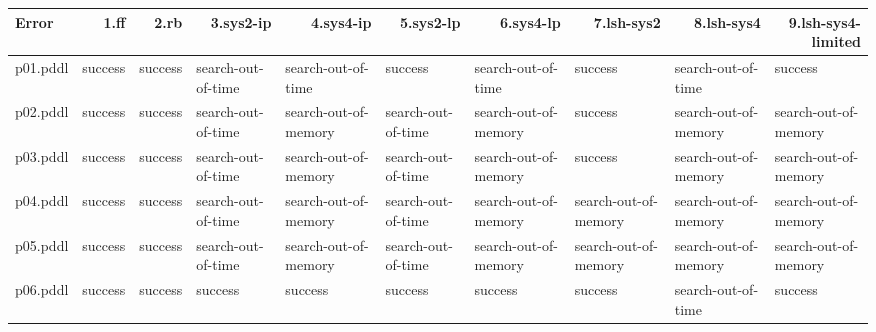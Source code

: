 \documentclass{article}
\begin{document}
\begin{tabular}{@{}lrrrrrrrrr@{}}
Error & 1.ff & 2.rb & 3.sys2-ip & 4.sys4-ip & 5.sys2-lp & 6.sys4-lp & 7.lsh-sys2 & 8.lsh-sys4 & 9.lsh-sys4-limited \\
\midrule
p01.pddl & \multicolumn{1}{|l|}{success} & \multicolumn{1}{|l|}{success} & \multicolumn{1}{|l|}{search-out-of-time} & \multicolumn{1}{|l|}{search-out-of-time} & \multicolumn{1}{|l|}{success} & \multicolumn{1}{|l|}{search-out-of-time} & \multicolumn{1}{|l|}{success} & \multicolumn{1}{|l|}{search-out-of-time} & \multicolumn{1}{|l|}{success} \\
p02.pddl & \multicolumn{1}{|l|}{success} & \multicolumn{1}{|l|}{success} & \multicolumn{1}{|l|}{search-out-of-time} & \multicolumn{1}{|l|}{search-out-of-memory} & \multicolumn{1}{|l|}{search-out-of-time} & \multicolumn{1}{|l|}{search-out-of-memory} & \multicolumn{1}{|l|}{success} & \multicolumn{1}{|l|}{search-out-of-memory} & \multicolumn{1}{|l|}{search-out-of-memory} \\
p03.pddl & \multicolumn{1}{|l|}{success} & \multicolumn{1}{|l|}{success} & \multicolumn{1}{|l|}{search-out-of-time} & \multicolumn{1}{|l|}{search-out-of-memory} & \multicolumn{1}{|l|}{search-out-of-time} & \multicolumn{1}{|l|}{search-out-of-memory} & \multicolumn{1}{|l|}{success} & \multicolumn{1}{|l|}{search-out-of-memory} & \multicolumn{1}{|l|}{search-out-of-memory} \\
p04.pddl & \multicolumn{1}{|l|}{success} & \multicolumn{1}{|l|}{success} & \multicolumn{1}{|l|}{search-out-of-time} & \multicolumn{1}{|l|}{search-out-of-memory} & \multicolumn{1}{|l|}{search-out-of-time} & \multicolumn{1}{|l|}{search-out-of-memory} & \multicolumn{1}{|l|}{search-out-of-memory} & \multicolumn{1}{|l|}{search-out-of-memory} & \multicolumn{1}{|l|}{search-out-of-memory} \\
p05.pddl & \multicolumn{1}{|l|}{success} & \multicolumn{1}{|l|}{success} & \multicolumn{1}{|l|}{search-out-of-time} & \multicolumn{1}{|l|}{search-out-of-memory} & \multicolumn{1}{|l|}{search-out-of-time} & \multicolumn{1}{|l|}{search-out-of-memory} & \multicolumn{1}{|l|}{search-out-of-memory} & \multicolumn{1}{|l|}{search-out-of-memory} & \multicolumn{1}{|l|}{search-out-of-memory} \\
p06.pddl & \multicolumn{1}{|l|}{success} & \multicolumn{1}{|l|}{success} & \multicolumn{1}{|l|}{success} & \multicolumn{1}{|l|}{success} & \multicolumn{1}{|l|}{success} & \multicolumn{1}{|l|}{success} & \multicolumn{1}{|l|}{success} & \multicolumn{1}{|l|}{search-out-of-time} & \multicolumn{1}{|l|}{success} \\

\end{tabular}
\end{document}
